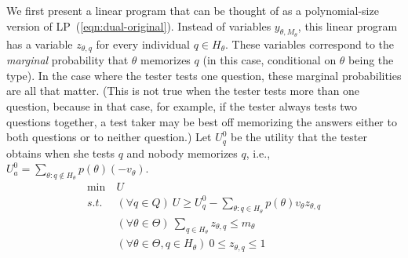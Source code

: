 \documentclass{article}
\begin{document}
We first present a  linear program that can be thought of as a
polynomial-size version of LP~(\ref{eqn:dual-original}).  Instead of 
variables $y_{\theta,M_\theta}$, this linear program has a variable
$z_{\theta,q}$ for every individual $q \in H_\theta$.  These variables
correspond to the {\em marginal} probability that $\theta$ memorizes $q$
(in this case, conditional on $\theta$ being the type).
In the case where the tester tests one question, these marginal
probabilities are all that matter.  (This is not true when the tester tests
more than one question, because in that case, for example, if the tester
always tests two questions together, a test taker may be best off
memorizing the answers either to both questions or to neither question.)
 Let
$U^0_q$ be the utility that the tester obtains when she tests $q$ and nobody
memorizes $q$, i.e., $U^0_a =
\sum_{\theta: q \notin H_\theta} p(\theta)(-v_\theta)$. 
\begin{align}\label{eqn:one-problem}
	\min~ &U\\
	s.t.~ &(\forall q \in Q)~ U \geq U^0_q - \sum_{\theta : q \in
          H_\theta} p(\theta)v_\theta z_{\theta,q}\nonumber\\
	&(\forall \theta \in \Theta)~ \sum_{q \in H_\theta} z_{\theta,q} \leq m_\theta\nonumber\\
	&(\forall \theta \in \Theta, q \in H_\theta)~ 0 \leq z_{\theta, q} \leq 1\nonumber
\end{align}

\end{document}
